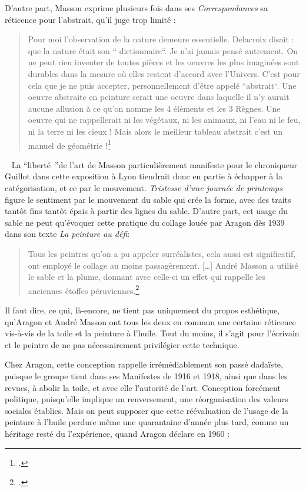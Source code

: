D’autre part, Masson exprime plusieurs fois dans ses \emph{Correspondances} sa réticence pour l’abstrait, qu’il juge trop limité : 
\begin{quote}
Pour moi l’observation de la nature demeure essentielle. Delacroix disait : que la nature était son “ dictionnaire“. Je n’ai jamais pensé autrement. On ne peut rien inventer de toutes pièces et les oeuvres les plus imaginées sont durables dans la mesure où elles restent d’accord avec l’Univers. C’est pour cela que je ne puis accepter, personnellement d’être appelé “abstrait“. Une oeuvre abstraite en peinture serait une oeuvre dans laquelle il n’y aurait aucune allusion à ce qu’on nomme les 4 éléments et les 3 Règnes. Une oeuvre qui ne rappellerait ni les végétaux, ni les animaux, ni l’eau ni le feu, ni la terre ni les cieux ! Mais alors le meilleur tableau abstrait c’est un manuel de géométrie !\footcite[p464]{anneessurrealistes}\end{quote}
 
	La \enquote{liberté }de l’art de Masson particulièrement manifeste pour le chroniqueur Guillot dans cette exposition à Lyon tiendrait donc en partie à échapper à la catégorisation, et ce par le mouvement. \emph{Tristesse d’une journée de printemps} figure le sentiment par le mouvement du sable qui crée la forme, avec des traits tantôt fins tantôt épais à partir des lignes du sable. D’autre part, cet usage du sable ne peut qu’évoquer cette pratique du collage louée par Aragon dès 1939 dans son texte \emph{La peinture au défi}:
\begin{quote}
Tous les peintres qu’on a pu appeler surréalistes, cela aussi est significatif, ont employé le collage au moins passagèrement. […] André Masson a utilisé le sable et la plume, donnant avec celle-ci un effet qui rappelle les anciennes étoffes péruviennes.\footcite[p78]{ecritssurla}\end{quote}	


 	 Il faut dire, ce qui, là-encore, ne tient pas uniquement du propos esthétique, qu’Aragon et André Masson ont tous les deux en commun une certaine réticence vis-à-vis de la toile et la peinture à l’huile. Tout du moins, il s’agit pour l’écrivain et le peintre de ne pas nécessairement privilégier cette technique. 

	Chez Aragon, cette conception rappelle irrémédiablement son passé dadaïste, puisque le groupe tient dans ses Manifestes de 1916 et 1918, ainsi que dans les revues, à abolir la toile, et avec elle l’autorité de l’art. Conception forcément politique, puisqu’elle implique un renversement, une réorganisation des valeurs sociales établies. Mais on peut supposer que cette réévaluation de l’usage de la peinture à l’huile perdure même une quarantaine d’année plus tard, comme un héritage resté du l’expérience, quand Aragon déclare en 1960 : 

